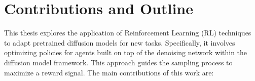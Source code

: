 
\section{Contributions and Outline}


This thesis explores the application of Reinforcement Learning (RL) techniques to adapt pretrained diffusion models for new tasks. Specifically, it involves optimizing policies for agents built on top of the denoising network within the diffusion model framework. This approach guides the sampling process to maximize a reward signal. The main contributions of this work are: \\


